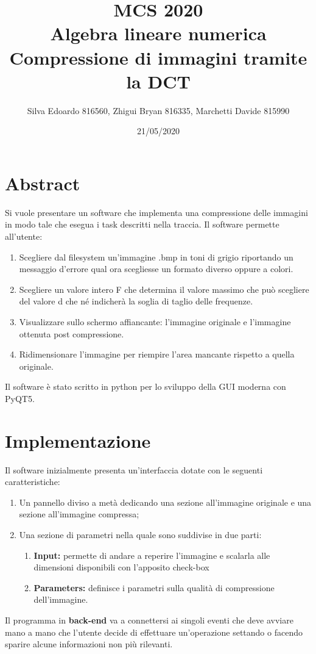 \documentclass[12pt]{article}
\title{%
  MCS 2020 \\
  \large Algebra lineare numerica \\
   Compressione di immagini tramite la DCT}
\date{21/05/2020}
\author{Silva Edoardo 816560, Zhigui Bryan 816335, Marchetti Davide 815990}
\begin{document}
\maketitle

\section{Abstract}

	Si vuole presentare un software che implementa una compressione delle immagini in modo tale che esegua i task descritti nella traccia.
	\newline
	Il software permette all’utente:
	\begin{enumerate}
		\item Scegliere dal filesystem un’immagine .bmp in toni di grigio riportando un messaggio d’errore qual ora scegliesse un formato diverso oppure a colori.
	 	\item Scegliere un valore intero F che determina il valore massimo che può scegliere del valore d che né indicherà la soglia di taglio delle frequenze.
 		\item Visualizzare sullo schermo affiancante: l’immagine originale e l’immagine ottenuta post compressione.
		\item Ridimensionare l’immagine per riempire l’area mancante rispetto a quella originale.
	\end{enumerate}

Il software è stato scritto in python per lo sviluppo della GUI moderna con PyQT5.
\newpage
\section{Implementazione}

	Il software inizialmente presenta un’interfaccia dotate con le seguenti caratteristiche:
	\begin{enumerate}
		\item Un pannello diviso a metà dedicando una sezione all’immagine originale e una sezione all’immagine compressa;
		\item Una sezione di parametri nella quale sono suddivise in due parti:
		\begin{enumerate}[label=\Alph*]
			\item \textbf{Input:} permette di andare a reperire l’immagine e scalarla alle dimensioni disponibili con l’apposito check-box
			\item \textbf{Parameters:} definisce i parametri sulla qualità di compressione dell’immagine.
		\end{enumerate}
	\end{enumerate}
	Il programma in \textbf{back-end} va a connettersi ai singoli eventi che deve avviare mano a mano che l’utente decide di effettuare un’operazione settando o facendo sparire alcune informazioni non più rilevanti.
\end{document}
